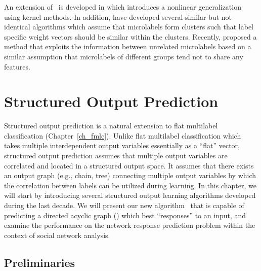 {An extension of \mtl\ is developed in \citep{Argyriou08convex} which introduces a nonlinear generalization using kernel methods.
In addition, \citet{Argyriou08an,Jacob09cluster} have developed several similar but not identical algorithms which assume that microlabels form clusters such that label specific weight vectors should be similar within the clusters.
Recently, \citet{Paredes12exploit} proposed a method that exploits the information between unrelated microlabels based on a similar assumption that microlabels of different groups tend not to share any features.




%
%
\chapter{Structured Output Prediction} \label{ch_sop}

Structured output prediction is a natural extension to flat multilabel classification (Chapter~\ref{ch_fmlc}).
Unlike flat multilabel classification which takes multiple interdependent output variables essentially as a ``flat'' vector, structured output prediction assumes that multiple output variables are correlated and located in a structured output space.
It assumes that there exists an output graph (e.g., chain, tree) connecting multiple output variables by which the correlation between labels can be utilized during learning.
In this chapter, we will start by introducing several structured output learning algorithms developed during the last decade.
We will present our new algorithm \spin\ that is capable of predicting a directed acyclic graph (\daggraph) which best ``responses'' to an input, and examine the performance on the network response prediction problem within the context of social network analysis.



%
%
\section{Preliminaries}

}
